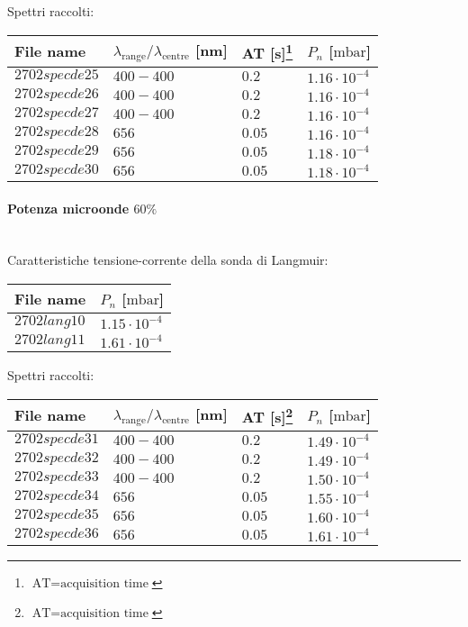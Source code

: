 Spettri raccolti:
\begin{center}
\begin{tabular}{p{3cm}p{4cm}p{2cm}p{3cm}}
\toprule
File name	&$\lambda_\text{range}\text{/}\lambda_\text{centre}$ [nm] 	&AT [s]\footnote{$\text{AT}=\text{acquisition time}$} &$P_n$ [$\si{\milli\bar}$]\\
\midrule
$2702specde25$	&$400-400$	&$0.2$		&$1.16\cdot10^{-4}$\\
$2702specde26$	&$400-400$	&$0.2$		&$1.16\cdot10^{-4}$\\
$2702specde27$	&$400-400$	&$0.2$		&$1.16\cdot10^{-4}$\\
$2702specde28$	&$656$		&$0.05$		&$1.16\cdot10^{-4}$\\
$2702specde29$	&$656$		&$0.05$		&$1.18\cdot10^{-4}$\\
$2702specde30$	&$656$		&$0.05$		&$1.18\cdot10^{-4}$\\
\bottomrule
\end{tabular}
\end{center}

\paragraph*{Potenza microonde $\text{60\%}$} ~\\
Caratteristiche tensione-corrente della sonda di Langmuir:
\begin{center}
\begin{tabular}{p{3cm}p{3cm}}
\toprule
File name	&$P_n$ [$\si{\milli\bar}$]\\
\midrule
$2702lang10$	&$1.15\cdot10^{-4}$\\
$2702lang11$	&$1.61\cdot10^{-4}$\\
\bottomrule
\end{tabular}
\end{center}

Spettri raccolti:
\begin{center}
\begin{tabular}{p{3cm}p{4cm}p{2cm}p{3cm}}
\toprule
File name	&$\lambda_\text{range}\text{/}\lambda_\text{centre}$ [nm] 	&AT [s]\footnote{$\text{AT}=\text{acquisition time}$} &$P_n$ [$\si{\milli\bar}$]\\
\midrule
$2702specde31$	&$400-400$	&$0.2$		&$1.49\cdot10^{-4}$\\
$2702specde32$	&$400-400$	&$0.2$		&$1.49\cdot10^{-4}$\\
$2702specde33$	&$400-400$	&$0.2$		&$1.50\cdot10^{-4}$\\
$2702specde34$	&$656$		&$0.05$		&$1.55\cdot10^{-4}$\\
$2702specde35$	&$656$		&$0.05$		&$1.60\cdot10^{-4}$\\
$2702specde36$	&$656$		&$0.05$		&$1.61\cdot10^{-4}$\\
\bottomrule
\end{tabular}
\end{center}